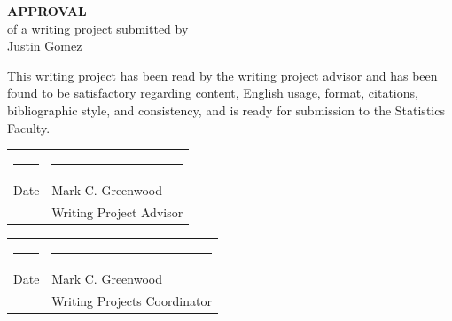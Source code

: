 \documentclass[12pt]{article}\usepackage[]{graphicx}\usepackage[]{color}
\begin{document}
\begin{titlepage}
\null
\vspace{1.in}
\begin{center}
{\bf\huge APPROVAL}\\[1.in]
of a writing project submitted by\\[.25in]
Justin Gomez \\[1.in]
\end{center}
\noindent
This writing project has been read by the writing project advisor and
has been found to be satisfactory regarding content, English usage,
format, citations, bibliographic style, and consistency, and is ready
for submission to the Statistics Faculty.

\vspace{.3in}
\begin{center}
\begin{tabular}{ll}
\rule{2.75in}{.03in} & \rule{2.75in}{.03in} \\
Date& Mark C. Greenwood \\
& Writing Project Advisor \\
\end{tabular}
\end{center}

\vspace{1cm}

\begin{center}
\begin{tabular}{ll}
\rule{2.75in}{.03in} & \rule{2.75in}{.03in} \\
Date& Mark C. Greenwood \\
& Writing Projects Coordinator \\
\end{tabular}
\end{center}

\end{titlepage}
\end{document}
